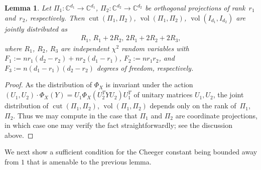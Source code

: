\documentclass[aos]{imsart}
\newtheorem{lemma}[theorem]{Lemma}
\theoremstyle{definition}
\numberwithin{equation}{section}
\DeclareMathOperator{\vol}{vol}
\DeclareMathOperator{\cut}{cut}
\newcommand{\C}{{\mathbb{C}}}
\begin{document}
\begin{appendix}
\begin{lemma}\label{fact:chi}
Let $\Pi_1\colon\C^{d_1} \to \C^{d_1}$, $\Pi_2\colon \C^{d_2} \to \C^{d_2}$ be orthogonal projections of rank~$r_1$ and~$r_2$, respectively.
Then $\cut(\Pi_1, \Pi_2)$, $\vol(\Pi_1, \Pi_2)$, $\vol(I_{d_1}, I_{d_2})$ are jointly distributed as
\begin{align*}
  R_1, \, R_1 + 2R_2, \, 2R_1 + 2 R_2 + 2R_3,
\end{align*}
where $R_1$, $R_2$, $R_3$ are independent $\chi^2$ random variables with $F_1:=n r_1(d_2 - r_2) + n r_2(d_1-r_1)$, $F_2:= n r_1r_2$, and $F_3:= n(d_1 - r_1)(d_2 - r_2)$ degrees of freedom, respectively.
\end{lemma}
\begin{proof} As the distribution of $\Phi_X$ is invariant under the action $(U_1, U_2) \cdot \Phi_X(Y) =  U_1\Phi_X( U_2^T Y U_2) U_1^T$ of unitary matrices $U_1, U_2$, the joint distribution of $\cut(\Pi_1, \Pi_2)$, $\vol(\Pi_1, \Pi_2)$ depends only on the rank of~$\Pi_1$, $\Pi_2$. Thus we may compute in the case that $\Pi_1$ and $\Pi_2$ are coordinate projections, in which case one may verify the fact straightforwardly; see the discussion above.
\end{proof}

We next show a sufficient condition for the Cheeger constant being bounded away from $1$ that is amenable to the previous lemma.


\end{appendix}
\end{document}
